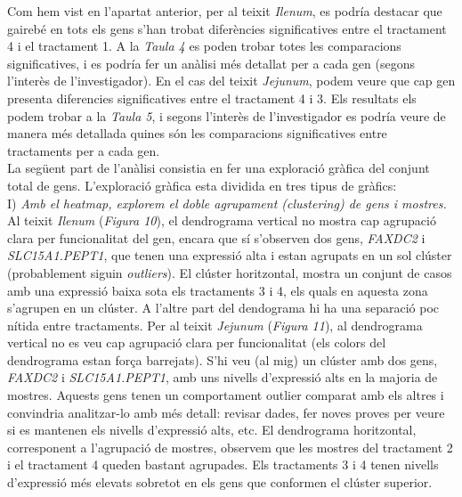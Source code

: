 \documentclass[english]{article}
\begin{document}
Com hem vist en l'apartat anterior, per al teixit \textit{Ilenum}, es podría destacar que gairebé en tots els gens s'han trobat diferències significatives entre el tractament 4 i el tractament 1. A la \emph{Taula 4} es poden trobar totes les comparacions significatives, i es podría fer un anàlisi més detallat per a cada gen (segons l'interès de l'investigador). En el cas del teixit \textit{Jejunum}, podem veure que cap gen presenta diferencies significatives entre el tractament 4 i 3. Els resultats els podem trobar a la \textit{Taula 5}, i segons l'interès de l'investigador es podría veure de manera més detallada quines són les comparacions significatives entre tractaments per a cada gen.
\\

La següent part de l'anàlisi consistia en fer una exploració gràfica del conjunt total de gens. L'exploració gràfica esta dividida en tres tipus de gràfics:
\\

\noindent I)\textit{ Amb el heatmap, explorem el doble agrupament (clustering) de gens i mostres.}
\\

Al teixit \textit{Ilenum} (\textit{Figura 10}), el dendrograma vertical no mostra cap agrupació clara per funcionalitat del gen, encara que sí s'observen dos gens, \textit{FAXDC2} i \textit{SLC15A1.PEPT1}, que tenen una expressió alta i estan agrupats en un sol clúster (probablement siguin \textit{outliers}). El clúster horitzontal, mostra un conjunt de casos amb una expressió baixa sota els tractaments 3 i 4, els quals en aquesta zona s'agrupen en un clúster. A l'altre part del dendograma hi ha una separació poc nítida entre tractaments. Per al teixit \textit{Jejunum} (\textit{Figura 11}), al dendrograma vertical no es veu cap agrupació clara per funcionalitat (els colors del dendrograma estan força barrejats). S’hi veu (al mig) un clúster amb dos gens, \textit{FAXDC2} i \textit{SLC15A1.PEPT1}, amb uns nivells d’expressió alts en la majoria de mostres. Aquests gens tenen un comportament outlier comparat amb els altres i convindria analitzar-lo amb més detall: revisar dades, fer noves proves per veure si es mantenen els nivells d’expressió alts, etc. El dendrograma horitzontal, corresponent a l'agrupació de mostres, observem que les mostres del tractament 2 i el tractament 4 queden bastant agrupades. Els tractaments 3 i 4 tenen nivells d'expressió més elevats sobretot en els gens que conformen el clúster superior.
\\
\end{document}
